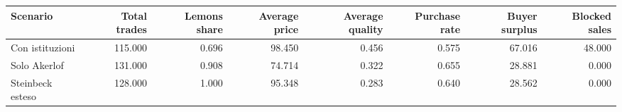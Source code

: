 \begin{tabular}{lrrrrrrr}
\toprule
Scenario & Total trades & Lemons share & Average price & Average quality & Purchase rate & Buyer surplus & Blocked sales \\
\midrule
Con istituzioni & 115.000 & 0.696 & 98.450 & 0.456 & 0.575 & 67.016 & 48.000 \\
Solo Akerlof & 131.000 & 0.908 & 74.714 & 0.322 & 0.655 & 28.881 & 0.000 \\
Steinbeck esteso & 128.000 & 1.000 & 95.348 & 0.283 & 0.640 & 28.562 & 0.000 \\
\bottomrule
\end{tabular}
